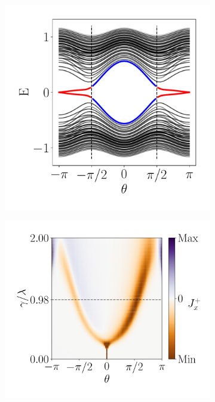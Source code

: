 \begin{figure}[h!]
     \centering
    \captionsetup[sub]{font=small}
     \begin{minipage}[h!]{1\textwidth}
         \begin{subfigure}[b!]{0.3 \textwidth}
             \caption{}
             \includegraphics[width=\textwidth]{Imagenes/Resultados_pump_Cuadrado/xy/param_pump_A=0.5.pdf}
             \label{}
         \end{subfigure}\hspace*{-0.5em}
         \begin{subfigure}[b!]{0.35 \textwidth}
             \caption{}
             \includegraphics[width=\textwidth]{Imagenes/Resultados_pump_Cuadrado/xy/current_square_pump.pdf}

\end{subfigure}
\end{minipage}
\end{figure}

